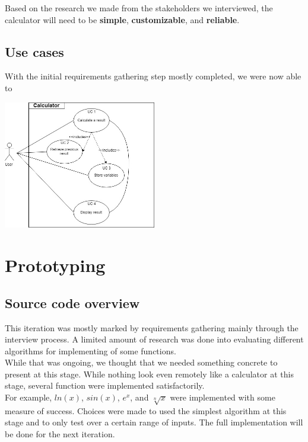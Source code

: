 \documentclass[a4paper]{article}
\begin{document}
Based on the research we made from the stakeholders we interviewed, the calculator will need to be \textbf{simple}, \textbf{customizable}, and \textbf{reliable}.

\subsection{Use cases}

With the initial requirements gathering step mostly completed, we were now able to 

\begin{center}
\includegraphics[width=0.5\textwidth]{UseCaseDiagram.jpg}
\end{center}

\section{}

\section{Prototyping}

\subsection{Source code overview}

This iteration was mostly marked by requirements gathering mainly through the interview process. A limited amount of research was done into evaluating different algorithms for implementing of some functions. \\

While that was ongoing, we thought that we needed something concrete to present at this stage. While nothing look even remotely like a calculator at this stage, several function were implemented satisfactorily. \\

For example, $ln(x)$, $sin(x)$, $e^x$, and $\sqrt[n]{x}$ were implemented with some measure of success. Choices were made to used the simplest algorithm at this stage and to only test over a certain range of inputs. The full implementation will be done for the next iteration. \\
\end{document}
